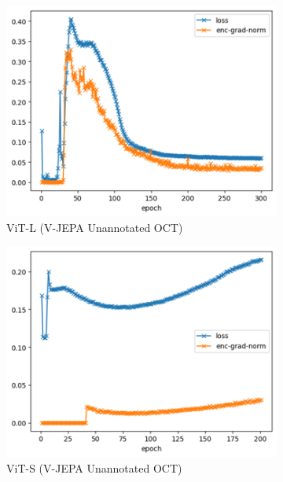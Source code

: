 \documentclass[a4paper,11pt,oneside]{report}
\begin{document}
\begin{figure}[hbt]
    \centering
    \begin{subfigure}[t]{0.3\textwidth}
        \centering
        \includegraphics[width=0.9\linewidth]{figures/discussion_vjepa_training_1.png}
        \caption{ViT-L (V-JEPA Unannotated OCT)}
    \end{subfigure}\hfill%
    \begin{subfigure}[t]{0.3\textwidth}
        \centering
        \includegraphics[width=0.9\linewidth]{figures/discussion_vjepa_training_2.png}
        \caption{ViT-S (V-JEPA Unannotated OCT)}
    \end{subfigure}\hfill%
    \begin{subfigure}[t]{0.3\textwidth}
        \centering

\end{subfigure}
\end{figure}
\end{document}
